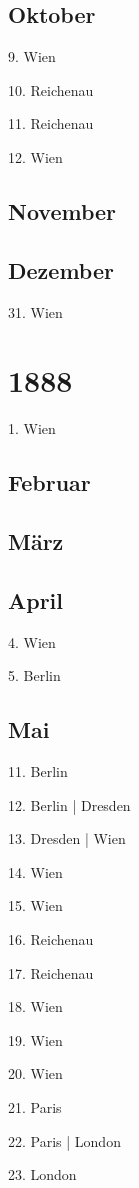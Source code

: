 \documentclass[twoside=false,titlepage=false,open=any, parskip=never, fontsize=10pt, headings=small, chapterprefix=false, appendixprefix=false, DIV=15]{scrbook}
\begin{document}
\begin{multicols}{3}
            \section*{Oktober}
            9. Wien\par
            10. Reichenau\par
            11. Reichenau\par
            12. Wien\par
            \section*{November}
            \section*{Dezember}
            31. Wien\par
            \chapter*{1888}
            1. Wien\par
            \section*{Februar}
            \section*{März}
            \section*{April}
            4. Wien\par
            5. Berlin\par
            \section*{Mai}
            11. Berlin\par
            12. Berlin | Dresden\par
            13. Dresden | Wien\par
            14. Wien\par
            15. Wien\par
            16. Reichenau\par
            17. Reichenau\par
            18. Wien\par
            19. Wien\par
            20. Wien\par
            21. Paris\par
            22. Paris | London\par
            23. London\par

\end{multicols}
\end{document}
